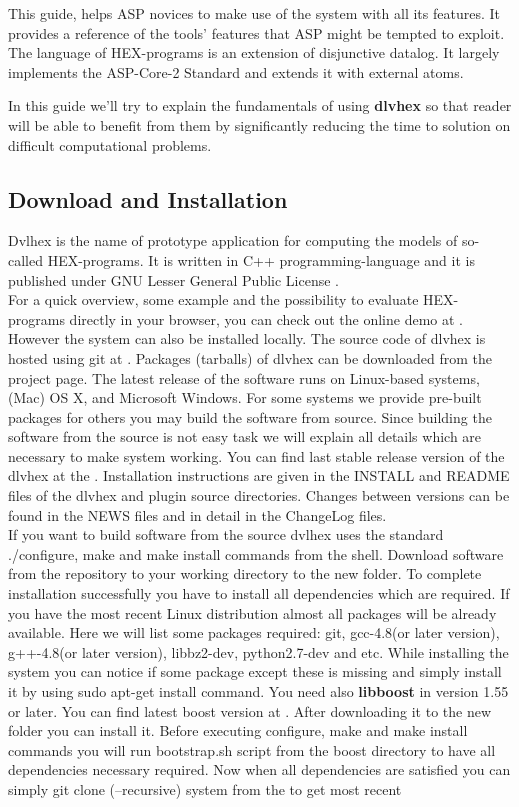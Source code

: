 \documentclass[14pt,a4paper, titlepage]{article}
\begin{document}
This guide, helps ASP novices to make use of the system with all its features. It provides a reference of the tools' features that ASP might be tempted to exploit. The language of HEX-programs is an extension of disjunctive datalog. It largely implements the ASP-Core-2 Standard \cite{ref} and extends it with external atoms. 

In this guide we'll try to explain the fundamentals of using \textbf{dlvhex} so that reader will be able to benefit from them by significantly reducing the time to solution on difficult computational problems. 


\subsection{Download and Installation}
Dvlhex is the name of prototype application for computing the models of so-called HEX-programs. It is written in C++ programming-language and it is published under GNU Lesser General Public License \cite{licnc}.\bigskip \\For a quick overview, some example and the possibility to evaluate HEX-programs directly in your browser, you can check out the online demo at \cite{onlinedemo}. However the system can also be installed locally. The source code of dlvhex is hosted using git at \cite{git}. Packages (tarballs) of dlvhex can be downloaded from the \cite{sourceforge} project page. The latest release of the software runs on Linux-based systems, (Mac) OS X, and Microsoft Windows. For some systems we provide pre-built packages \cite{prebuilt}  for others you may build the software from source. Since building the software from the source is not easy task we will explain all details which are necessary to make system working. You can find last stable release version of the dlvhex at the \cite{sourceforge}. Installation instructions are given in the INSTALL and README files of the dlvhex and plugin source directories. Changes between versions can be found in the NEWS files and in detail in the ChangeLog files.\bigskip \\If you want to build software from the source dvlhex uses the standard ./configure, make and make install commands from the shell. Download software from the repository to your working directory to the new folder. To complete installation successfully you have to install all dependencies which are required. If you have the most recent Linux distribution almost all packages will be already available. Here we will list some packages required: git, gcc-4.8(or later version), g++-4.8(or later version), libbz2-dev, python2.7-dev and etc. While installing the system you can notice if some package except these is missing and simply install it by using sudo apt-get install command. You need also \textbf{libboost} in version 1.55 or later. You can find latest boost version at \cite{boost}. After downloading it to the new folder you can install it. Before executing configure, make and make install commands you will run bootstrap.sh script from the boost directory to have all dependencies necessary required. Now when all dependencies are satisfied you can simply git clone (--recursive) system from the \cite{hexhex} to get most recent 
\end{document}
